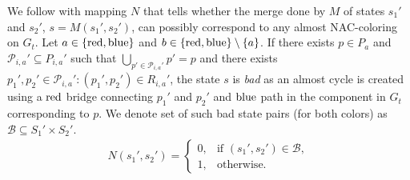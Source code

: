 We follow with mapping \( N \) that tells whether the merge done by \( M \)
of states \( s_1' \) and \( s_2' \), \( s = M(s_1', s_2') \),
can possibly correspond to any almost NAC-coloring on \( G_t \).
%
Let \( a \in \{\text{red}, \text{blue} \} \) and \( b \in \{\text{red}, \text{blue} \} \setminus \{a\} \).
If there exists \( p \in P_{a} \)
and \( \mathcal{P}_{i, a}' \subseteq P_{i, a}' \) such that \( \bigcup_{p' \in \mathcal{P}_{i, a}'} p' = p \)
and there exists \( p_1', p_2' \in \mathcal{P}_{i, a}' : (p_1', p_2') \in R_{i, a}' \),
the state \( s \) is \emph{bad} as an almost cycle is created
using a \( \text{red} \) bridge connecting \( p_1' \) and \( p_2' \) and \( \text{blue} \) path
in the component in \( G_t \) corresponding to \( p \).
%
We denote set of such bad state pairs (for both colors) as \( \mathcal{B} \subseteq S_1' \times S_2' \).
%
\begin{align*}
	N(s_1', s_2') =
	\begin{cases}
		0, & \text{if } (s_1', s_2') \in \mathcal{B}, \\
		1, & \text{otherwise}.
	\end{cases}
\end{align*}
%

